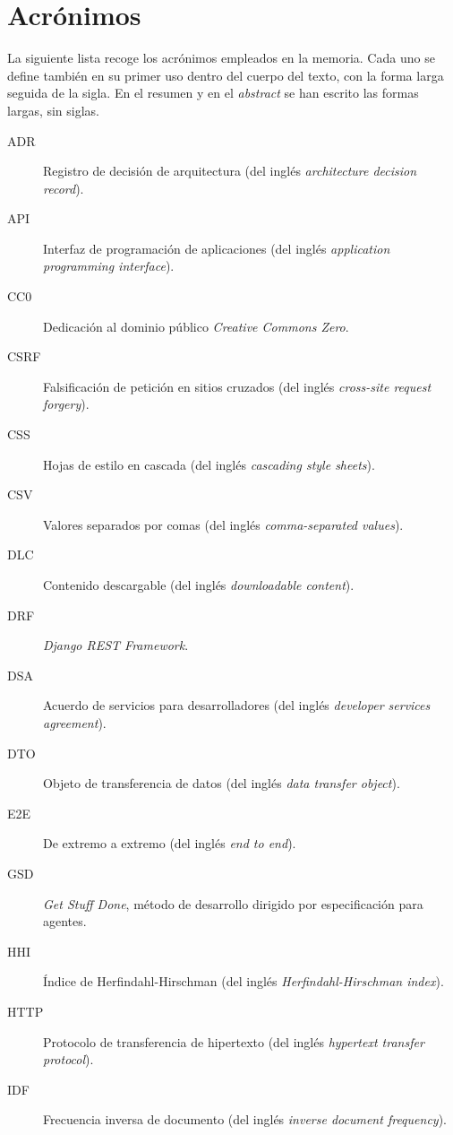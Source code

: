 \chapter*{Acrónimos}

La siguiente lista recoge los acrónimos empleados en la memoria. Cada uno se define también
en su primer uso dentro del cuerpo del texto, con la forma larga seguida de la sigla. En el
resumen y en el \textit{abstract} se han escrito las formas largas, sin siglas.

\begin{description}
    \item[ADR] Registro de decisión de arquitectura (del inglés \textit{architecture decision record}).
    \item[API] Interfaz de programación de aplicaciones (del inglés \textit{application programming interface}).
    \item[CC0] Dedicación al dominio público \textit{Creative Commons Zero}.
    \item[CSRF] Falsificación de petición en sitios cruzados (del inglés \textit{cross-site request forgery}).
    \item[CSS] Hojas de estilo en cascada (del inglés \textit{cascading style sheets}).
    \item[CSV] Valores separados por comas (del inglés \textit{comma-separated values}).
    \item[DLC] Contenido descargable (del inglés \textit{downloadable content}).
    \item[DRF] \textit{Django REST Framework}.
    \item[DSA] Acuerdo de servicios para desarrolladores (del inglés \textit{developer services agreement}).
    \item[DTO] Objeto de transferencia de datos (del inglés \textit{data transfer object}).
    \item[E2E] De extremo a extremo (del inglés \textit{end to end}).
    \item[GSD] \textit{Get Stuff Done}, método de desarrollo dirigido por especificación para agentes.
    \item[HHI] Índice de Herfindahl-Hirschman (del inglés \textit{Herfindahl-Hirschman index}).
    \item[HTTP] Protocolo de transferencia de hipertexto (del inglés \textit{hypertext transfer protocol}).
    \item[IDF] Frecuencia inversa de documento (del inglés \textit{inverse document frequency}).

\end{description}

